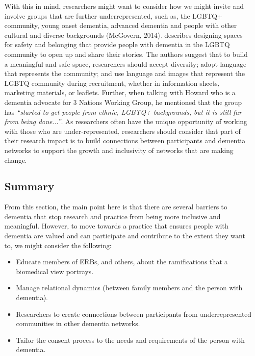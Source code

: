 With this in mind, researchers might want to consider how we might invite and involve groups that are further underrepresented, such as, the LGBTQ+ community, young onset dementia, advanced dementia and people with other cultural and diverse backgrounds \citep{foley_struggle_2019, bryden_before_2015} (McGovern, 2014). \cite{mcgovern2014forgotten} describes designing spaces for safety and belonging that provide people with dementia in the LGBTQ community to open up and share their stories. The authors suggest that to build a meaningful and safe space, researchers should accept diversity; adopt language that represents the community; and use language and images that represent the LGBTQ community during recruitment, whether in information sheets, marketing materials, or leaflets. Further, when talking with Howard who is a dementia advocate for 3 Nations Working Group, he mentioned that the group has \textit{``started to get people from ethnic, LGBTQ+ backgrounds, but it is still far from being done...''}. As researchers often have the unique opportunity of working with those who are under-represented, researchers should consider that part of their research impact is to build connections between participants and dementia networks to support the growth and inclusivity of networks that are making change. 

\subsection{Summary}
\label{EthicsSummary}
From this section, the main point here is that there are several barriers to dementia that stop research and practice from being more inclusive and meaningful. However, to move towards a practice that ensures people with dementia are valued and can participate and contribute to the extent they want to, we might consider the following:
\begin{itemize}
    \item Educate members of ERBs, and others, about the ramifications that a biomedical view portrays.
    \item Manage relational dynamics (between family members and the person with dementia).
    \item Researchers to create connections between participants from underrepresented communities in other dementia networks.
    \item Tailor the consent process to the needs and requirements of the person with dementia.
\end{itemize}

